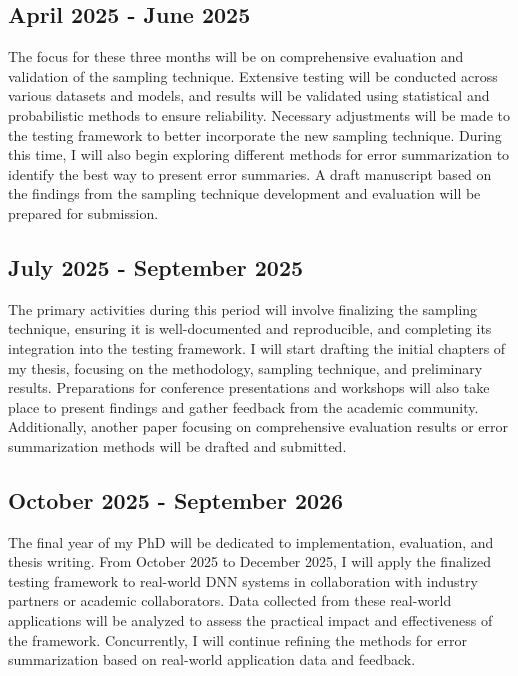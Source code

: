 \subsection{April 2025 - June 2025}

The focus for these three months will be on comprehensive evaluation and validation of the sampling technique. Extensive testing will be conducted across various datasets and models, and results will be validated using statistical and probabilistic methods to ensure reliability. Necessary adjustments will be made to the testing framework to better incorporate the new sampling technique. During this time, I will also begin exploring different methods for error summarization to identify the best way to present error summaries. A draft manuscript based on the findings from the sampling technique development and evaluation will be prepared for submission.

\subsection{July 2025 - September 2025}

The primary activities during this period will involve finalizing the sampling technique, ensuring it is well-documented and reproducible, and completing its integration into the testing framework. I will start drafting the initial chapters of my thesis, focusing on the methodology, sampling technique, and preliminary results. Preparations for conference presentations and workshops will also take place to present findings and gather feedback from the academic community. Additionally, another paper focusing on comprehensive evaluation results or error summarization methods will be drafted and submitted.

\subsection{October 2025 - September 2026}

The final year of my PhD will be dedicated to implementation, evaluation, and thesis writing. From October 2025 to December 2025, I will apply the finalized testing framework to real-world DNN systems in collaboration with industry partners or academic collaborators. Data collected from these real-world applications will be analyzed to assess the practical impact and effectiveness of the framework. Concurrently, I will continue refining the methods for error summarization based on real-world application data and feedback.

